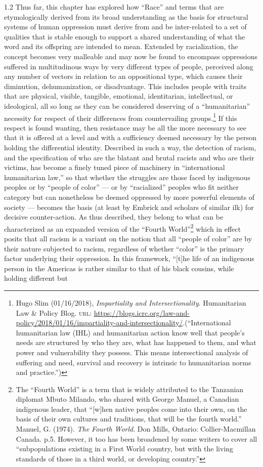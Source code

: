 \documentclass[../unravbook.tex]{subfiles}
\begin{document}
\begin{spacing}{1.2}
Thus far, this chapter has explored how ``Race'' and terms that are  etymologically derived from its broad understanding as the basis for structural systems of human oppression must derive from and be inter-related to a set of qualities that is stable enough to support a shared understanding of what the word and its offspring are intended to mean. Extended by racialization, the concept becomes very malleable and may now be found to encompass oppressions suffered in multitudinous ways by very different types of people, perceived along any number of vectors in relation to an oppositional type, which causes their diminution, dehumanization, or disadvantage. This includes people with traits that are physical, visible, tangible, emotional, identitarian, intellectual, or ideological, all so long as they can be considered deserving of a ``humanitarian'' necessity for respect of their differences from countervailing groups.\footnote{Hugo Slim (01/16/2018), \textit{Impartiality and Intersectionality}. Humanitarian Law \& Policy Blog. \textsc{url: } \url{https://blogs.icrc.org/law-and-policy/2018/01/16/impartiality-and-intersectionality/}.(``International humanitarian law (IHL) and humanitarian action know well that people's needs are structured by who they are, what has happened to them, and what power and vulnerability they possess. This means intersectional analysis of suffering and need, survival and recovery is intrinsic to humanitarian norms and practice.'')} If this respect is found wanting, then resistance may be all the more necessary to see that it is offered at a level and with a sufficiency deemed necessary by the person holding the differential identity. Described in such a way, the detection of racism, and the specification of who are the blatant and brutal racists and who are their victims, has become a finely tuned piece of machinery in ``international humanitarian law,'' so that whether the struggles are those faced by indigenous peoples or by ``people of color'' --- or by ``racialized'' peoples who fit neither category but can nonetheless be deemed oppressed by more powerful elements of society --- becomes the basis (at least by Embrick and scholars of similar ilk) for decisive counter-action. As thus described, they belong to what can be characterized as an expanded version of the ``Fourth World''\footnote{The ``Fourth World'' is a term that is widely attributed to the Tanzanian diplomat Mbuto Milando, who shared with George Manuel, a Canadian indigenous leader, that ``[w]hen native peoples come into their own, on the basis of their own cultures and traditions, that will be the fourth world.'' Manuel, G. (1974). \textit{The Fourth World}. Don Mills, Ontario: Collier-Macmillan Canada. p.5. However, it too has been broadened by some writers to cover all ``subpopulations existing in a First World country, but with the living standards of those in a third world, or developing country.''}  which in effect posits that all racism is a variant on the notion that all ``people of color'' are by their nature subjected to racism, regardless of whether ``color'' is the primary factor underlying their oppression. In this framework, ``[t]he life of an indigenous person in the Americas is rather similar to that of his black cousins, while holding different but 
\end{spacing}
\end{document}
